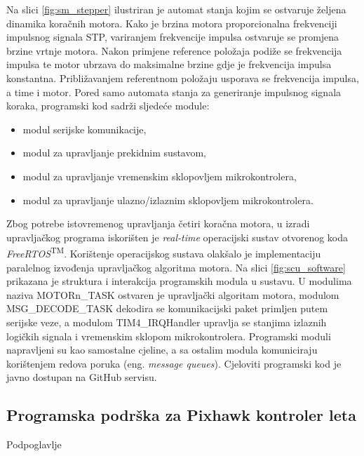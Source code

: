 \documentclass[11pt,a4paper]{article}
\begin{document}
Na slici \ref{fig:sm_stepper} ilustriran je automat stanja kojim se ostvaruje željena dinamika koračnih motora. Kako je brzina motora proporcionalna 
frekvenciji impulsnog signala STP, variranjem frekvencije impulsa ostvaruje se promjena brzine vrtnje motora. Nakon primjene reference položaja podiže se frekvencija impulsa te motor ubrzava do maksimalne brzine gdje je frekvencija impulsa konstantna. Približavanjem referentnom položaju usporava se frekvencija impulsa, a time i motor. \newline
Pored samo automata stanja za generiranje impulsnog signala koraka, programski kod sadrži sljedeće module:
\begin{itemize}
	\item modul serijske komunikacije,
	\item modul za upravljanje prekidnim sustavom,
	\item modul za upravljanje vremenskim sklopovljem mikrokontrolera,
	\item modul za upravljanje ulazno/izlaznim sklopovljem mikrokontrolera.
\end{itemize}
Zbog potrebe istovremenog upravljanja četiri koračna motora, u izradi upravljačkog programa iskorišten je \textit{real-time} operacijski sustav otvorenog koda \textit{FreeRTOS}\textsuperscript{TM}. Korištenje operacijskog sustava olakšalo je implementaciju paralelnog izvođenja upravljačkog algoritma motora. Na slici \ref{fig:scu_software} prikazana je struktura i interakcija programskih modula u sustavu. U modulima naziva MOTORn\_TASK
ostvaren je upravljački algoritam motora, modulom MSG\_DECODE\_TASK dekodira se komunikacijski paket primljen putem serijske veze, a modulom TIM4\_IRQHandler upravlja se stanjima izlaznih logičkih signala i vremenskim sklopom mikrokontrolera. Programski moduli napravljeni su kao samostalne
cjeline, a sa ostalim modula komuniciraju korištenjem redova poruka (eng. \textit{message queues}). Cjeloviti programski kod je javno dostupan na GitHub servisu. %

\subsection{Programska podrška za Pixhawk kontroler leta}
Podpoglavlje
\end{document}
